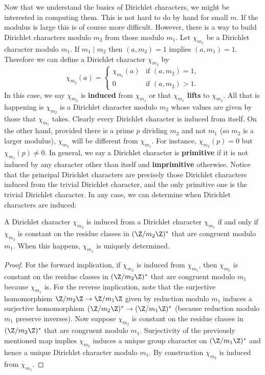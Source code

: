      Now that we understand the basics of Dirichlet characters, we might be interested in computing them. This is not hard to do by hand for small $m$. If the modulus is large this is of course more difficult. However, there is a way to build Dirichlet characters modulo $m_{2}$ from those modulo $m_{1}$. Let $\chi_{m_{1}}$ be a Dirichlet character modulo $m_{1}$. If $m_{1} \mid m_{2}$ then $(a,m_{2}) = 1$ implies $(a,m_{1}) = 1$. Therefore we can define a Dirichlet character $\chi_{m_{2}}$ by
      \[
        \chi_{m_{2}}(a) = \begin{cases} \chi_{m_{1}}(a) & \text{if $(a,m_{2}) = 1$}, \\ 0 & \text{if $(a,m_{2}) > 1$}. \end{cases}
      \]
      In this case, we say $\chi_{m_{2}}$ is \textbf{induced} from $\chi_{m_{1}}$ or that $\chi_{m_{1}}$ \textbf{lifts} to $\chi_{m_{2}}$. All that is happening is $\chi_{m_{2}}$ is a Dirichlet character modulo $m_{2}$ whose values are given by those that $\chi_{m_{1}}$ takes. Clearly every Dirichlet character is induced from itself. On the other hand, provided there is a prime $p$ dividing $m_{2}$ and not $m_{1}$ (so $m_{2}$ is a larger modulus), $\chi_{m_{2}}$ will be different from $\chi_{m_{1}}$. For instance, $\chi_{m_{2}}(p) = 0$ but $\chi_{m_{1}}(p) \neq 0$. In general, we say a Dirichlet character is \textbf{primitive} if it is not induced by any character other than itself and \textbf{imprimitive} otherwise. Notice that the principal Dirichlet characters are precisely those Dirichlet characters induced from the trivial Dirichlet character, and the only primitive one is the trivial Dirichlet character. In any case, we can determine when Dirichlet characters are induced:

      \begin{proposition}\label{prop:Dirichlet_character_induction_classification}
        A Dirichlet character $\chi_{m_{2}}$ is induced from a Dirichlet character $\chi_{m_{1}}$ if and only if $\chi_{m_{2}}$ is constant on the residue classes in $(\Z/m_{2}\Z)^{\ast}$ that are congruent modulo $m_{1}$. When this happens, $\chi_{m_{1}}$ is uniquely determined.
      \end{proposition}
      \begin{proof}
        For the forward implication, if $\chi_{m_{2}}$ is induced from $\chi_{m_{1}}$, then $\chi_{m_{2}}$ is constant on the residue classes in $(\Z/m_{2}\Z)^{\ast}$ that are congruent modulo $m_{1}$ because $\chi_{m_{1}}$ is. For the reverse implication, note that the surjective homomorphism $\Z/m_{2}\Z \to \Z/m_{1}\Z$ given by reduction modulo $m_{1}$ induces a surjective homomorphism $(\Z/m_{2}\Z)^{\ast} \to (\Z/m_{1}\Z)^{\ast}$ (because reduction modulo $m_{1}$ preserve inverses). Now suppose $\chi_{m_{2}}$ is constant on the residue classes in $(\Z/m_{2}\Z)^{\ast}$ that are congruent modulo $m_{1}$. Surjectivity of the previously mentioned map implies $\chi_{m_{2}}$ induces a unique group character on $(\Z/m_{1}\Z)^{\ast}$ and hence a unique Dirichlet character modulo $m_{1}$. By construction $\chi_{m_{2}}$ is induced from $\chi_{m_{1}}$.
      \end{proof}

